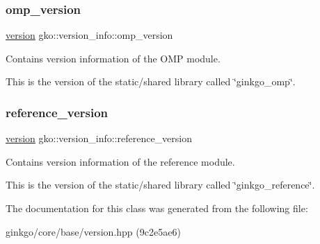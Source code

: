 \subsubsection{\texorpdfstring{omp\+\_\+version}{omp\_version}}
{\footnotesize\ttfamily \hyperlink{structgko_1_1version}{version} gko\+::version\+\_\+info\+::omp\+\_\+version}



Contains version information of the O\+MP module. 

This is the version of the static/shared library called \char`\"{}ginkgo\+\_\+omp\char`\"{}. \mbox{\label{classgko_1_1version__info_a772fcf25f93d719b733602b4bba7d7ec}} 
\subsubsection{\texorpdfstring{reference\+\_\+version}{reference\_version}}
{\footnotesize\ttfamily \hyperlink{structgko_1_1version}{version} gko\+::version\+\_\+info\+::reference\+\_\+version}



Contains version information of the reference module. 

This is the version of the static/shared library called \char`\"{}ginkgo\+\_\+reference\char`\"{}. 

The documentation for this class was generated from the following file\+:\begin{DoxyCompactItemize}
\item 
ginkgo/core/base/version.\+hpp (9c2e5ae6)\end{DoxyCompactItemize}

